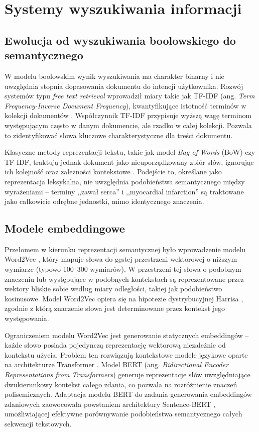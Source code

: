 \section{Systemy wyszukiwania informacji}

\subsection{Ewolucja od wyszukiwania boolowskiego do semantycznego}

W modelu boolowskim wynik wyszukiwania ma charakter binarny i nie uwzględnia stopnia dopasowania dokumentu do intencji użytkownika. Rozwój systemów typu \textit{free text retrieval} wprowadził miary takie jak TF-IDF (ang. \textit{Term Frequency-Inverse Document Frequency}), kwantyfikujące istotność terminów w kolekcji dokumentów \cite{sparckjones1972statistical, salton1988term}. Współczynnik TF-IDF przypisuje wyższą wagę terminom występującym często w danym dokumencie, ale rzadko w całej kolekcji. Pozwala to zidentyfikować słowa kluczowe charakterystyczne dla treści dokumentu.

Klasyczne metody reprezentacji tekstu, takie jak model \textit{Bag of Words} (BoW) czy TF-IDF, traktują jednak dokument jako nieuporządkowany zbiór słów, ignorując ich kolejność oraz zależności kontekstowe \cite{harris1954distributional}. Podejście to, określane jako reprezentacja leksykalna, nie uwzględnia podobieństwa semantycznego między wyrażeniami -- terminy ,,zawał serca'' i ,,myocardial infarction'' są traktowane jako całkowicie odrębne jednostki, mimo identycznego znaczenia.

\subsection{Modele embeddingowe}
\label{sec:embeddingi}

Przełomem w kierunku reprezentacji semantycznej było wprowadzenie modelu Word2Vec \cite{mikolov2013efficient, mikolov2013distributed}, który mapuje słowa do gęstej przestrzeni wektorowej o niższym wymiarze (typowo 100--300 wymiarów). W przestrzeni tej słowa o podobnym znaczeniu lub występujące w podobnych kontekstach są reprezentowane przez wektory bliskie sobie według miary odległości, takiej jak podobieństwo kosinusowe. Model Word2Vec opiera się na hipotezie dystrybucyjnej Harrisa \cite{harris1954distributional}, zgodnie z którą znaczenie słowa jest determinowane przez kontekst jego występowania.

Ograniczeniem modelu Word2Vec jest generowanie statycznych embeddingów -- każde słowo posiada pojedynczą reprezentację wektorową niezależnie od kontekstu użycia. Problem ten rozwiązują kontekstowe modele językowe oparte na architekturze Transformer \cite{vaswani2017attention}. Model BERT (ang. \textit{Bidirectional Encoder Representations from Transformers}) \cite{devlin2019bert} generuje reprezentacje słów uwzględniające dwukierunkowy kontekst całego zdania, co pozwala na rozróżnienie znaczeń polisemicznych. Adaptacja modelu BERT do zadania generowania embeddingów zdaniowych zaowocowała powstaniem architektury Sentence-BERT \cite{reimers2019sentence}, umożliwiającej efektywne porównywanie podobieństwa semantycznego całych sekwencji tekstowych.

